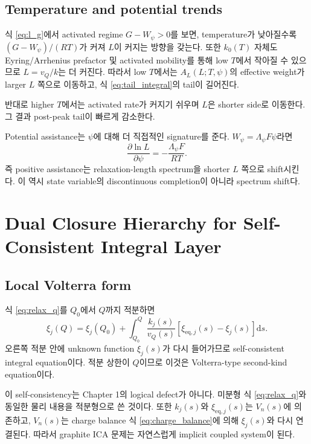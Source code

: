 \documentclass[11pt]{article}
\newcommand{\dd}{\mathrm{d}}
\newcommand{\eq}{\mathrm{eq}}
\begin{document}
\subsection{Temperature and potential trends}\label{subsec:t_potential_trend}

식 \eqref{eq:l_g}에서 activated regime \(G-W_\psi>0\)를 보면, temperature가 낮아질수록
\((G-W_\psi)/(RT)\)가 커져 \(L\)이 커지는 방향을 갖는다. 또한 \(k_0(T)\) 자체도 Eyring/Arrhenius
prefactor 및 activated mobility를 통해 low \(T\)에서 작아질 수 있으므로 \(L=v_Q/k\)는 더 커진다.
따라서 low \(T\)에서는 \(A_L(L;T,\psi)\)의 effective weight가 larger \(L\) 쪽으로 이동하고,
식 \eqref{eq:tail_integral}의 tail이 길어진다.

반대로 higher \(T\)에서는 activated rate가 커지기 쉬우며 \(L\)은 shorter side로 이동한다. 그 결과
post-peak tail이 빠르게 감소한다.

Potential assistance는 \(\psi\)에 대해 더 직접적인 signature를 준다. \(W_\psi=\Lambda_\psi F\psi\)라면
\begin{equation}
\frac{\partial \ln L}{\partial \psi}
=
-
\frac{\Lambda_\psi F}{RT}.
\label{eq:dlnl_dpsi}
\end{equation}
즉 positive assistance는 relaxation-length spectrum을 shorter \(L\) 쪽으로 shift시킨다. 이 역시
state variable의 discontinuous completion이 아니라 spectrum shift다.

\section{Dual Closure Hierarchy for Self-Consistent Integral Layer}\label{sec:self_consistent}

\subsection{Local Volterra form}\label{subsec:volterra}

식 \eqref{eq:relax_q}를 \(Q_0\)에서 \(Q\)까지 적분하면
\begin{equation}
\xi_j(Q)
=
\xi_j(Q_0)
+
\int_{Q_0}^{Q}
\frac{k_j(s)}{v_Q(s)}
\left[
\xi_{\eq,j}(s)-\xi_j(s)
\right]
\dd s.
\label{eq:volterra_q}
\end{equation}
오른쪽 적분 안에 unknown function \(\xi_j(s)\)가 다시 들어가므로 self-consistent integral
equation이다. 적분 상한이 \(Q\)이므로 이것은 Volterra-type second-kind equation이다.

이 self-consistency는 Chapter 1의 logical defect가 아니다. 미분형 식 \eqref{eq:relax_q}와 동일한
물리 내용을 적분형으로 쓴 것이다. 또한 \(k_j(s)\)와 \(\xi_{\eq,j}(s)\)는 \(V_n(s)\)에 의존하고,
\(V_n(s)\)는 charge balance 식 \eqref{eq:charge_balance}에 의해 \(\xi_j(s)\)와 다시 연결된다.
따라서 graphite ICA 문제는 자연스럽게 implicit coupled system이 된다.
\end{document}
